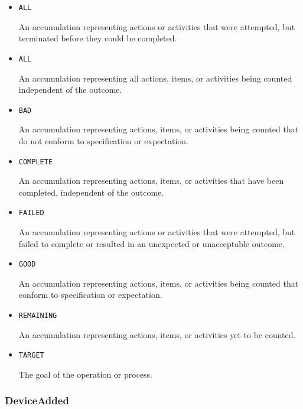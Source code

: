 \begin{itemize}

\item \texttt{ALL}


An accumulation representing actions or activities that were attempted, but terminated before they could be completed.

\item \texttt{ALL}


An accumulation representing all actions, items, or activities being counted independent of the outcome.

\item \texttt{BAD}


An accumulation representing actions, items, or activities being counted that do not conform to specification or expectation.

\item \texttt{COMPLETE}


An accumulation representing actions, items, or activities that have been completed, independent of the outcome.

\item \texttt{FAILED}


An accumulation representing actions or activities that were attempted, but failed to
complete or resulted in an unexpected or unacceptable outcome.

\item \texttt{GOOD}


An accumulation representing actions, items, or activities being counted that conform to specification or expectation.

\item \texttt{REMAINING}


An accumulation representing actions, items, or activities yet to be counted.

\item \texttt{TARGET}


The goal of the operation or process.


\end{itemize}











\subsubsection{DeviceAdded}
\label{sec:DeviceAdded}



